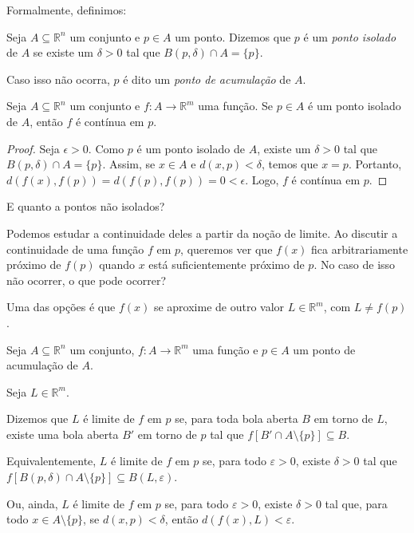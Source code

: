 Formalmente, definimos:

\begin{definition}
    Seja $A\subseteq \mathbb R^n$ um conjunto e $p \in A$ um ponto. Dizemos que $p$ é um \emph{ponto isolado}  de $A$ se existe um $\delta>0$ tal que $B(p,\delta) \cap A = \{p\}$.

    Caso isso não ocorra, $p$ é dito um \emph{ponto de acumulação}  de $A$.
\end{definition}

\begin{proposition}
    Seja $A\subseteq \mathbb R^n$ um conjunto e $f: A \to \mathbb R^m$ uma função. Se $p \in A$ é um ponto isolado de $A$, então $f$ é contínua em $p$.
\end{proposition}

\begin{proof}
    Seja $\epsilon>0$. Como $p$ é um ponto isolado de $A$, existe um $\delta>0$ tal que $B(p,\delta) \cap A = \{p\}$. Assim, se $x \in A$ e $d(x, p) < \delta$, temos que $x = p$. Portanto, $d(f(x), f(p)) = d(f(p), f(p)) = 0 < \epsilon$. Logo, $f$ é contínua em $p$.
\end{proof}

E quanto a pontos não isolados?

Podemos estudar a continuidade deles a partir da noção de limite.
Ao discutir a continuidade de uma função $f$ em $p$, queremos ver que $f(x)$ fica arbitrariamente próximo de $f(p)$ quando $x$ está suficientemente próximo de $p$.
No caso de isso não ocorrer, o que pode ocorrer?

Uma das opções é que $f(x)$ se aproxime de outro valor $L \in \mathbb R^m$, com $L \neq f(p)$.

\begin{definition}
    Seja $A\subseteq \mathbb R^n$ um conjunto, $f: A \to \mathbb R^m$ uma função e $p \in A$ um ponto de acumulação de $A$.

    Seja $L \in \mathbb R^m$.

    Dizemos que $L$ é limite de $f$ em $p$ se, para toda bola aberta $B$ em torno de $L$, existe uma bola aberta $B'$ em torno de $p$ tal que $f[B'\cap A\setminus\{p\}]\subseteq B$.

    Equivalentemente, $L$ é limite de $f$ em $p$ se, para todo $\varepsilon > 0$, existe $\delta > 0$ tal que $f[B(p, \delta)\cap A\setminus\{p\}]\subseteq B(L, \varepsilon)$.

        Ou, ainda, $L$ é limite de $f$ em $p$ se, para todo $\varepsilon > 0$, existe $\delta > 0$ tal que, para todo $x \in A\setminus\{p\}$, se $d(x, p) < \delta$, então $d(f(x), L) < \varepsilon$.
\end{definition}

